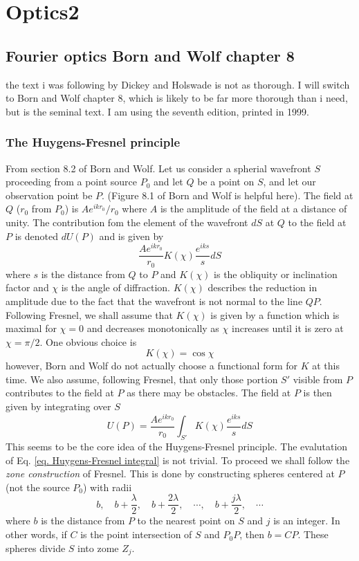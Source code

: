 \documentclass[../../main.tex]{subfiles} %
\begin{document}
\chapter{Optics2}
\section{Fourier optics Born and Wolf chapter 8 }
the text i was following by Dickey and Holswade is not as thorough. I will switch to Born and Wolf chapter 8, which is likely to be far more thorough than i need, but is the seminal text. I am using the seventh edition, printed in 1999.
\subsection{The Huygens-Fresnel principle}
From section 8.2 of Born and Wolf. Let us consider a spherial wavefront $S$ proceeding from a point source $P_0$ and let $Q$ be a point on $S$, and let our observation point be $P$. (Figure 8.1 of Born and Wolf is helpful here). The field at $Q$ ($r_0$ from $P_0$) is $A e^{ikr_0}/r_0$ where $A$ is the amplitude of the field at a distance of unity. The contribution fom the element of the wavefront $dS$ at $Q$ to the field at $P$ is denoted $dU(P)$ and is given by
\begin{equation}
    \frac{Ae^{ikr_0}}{r_0}K(\chi)\frac{e^{iks}}{s}dS
\end{equation}
where $s$ is the distance from $Q$ to $P$ and $K(\chi)$ is the obliquity or inclination factor and $\chi$ is the angle of diffraction. $K(\chi)$ describes the reduction in amplitude due to the fact that the wavefront is not normal to the line $QP$. Following Fresnel, we shall assume that $K(\chi)$ is given by a function which is maximal for $\chi=0$ and decreases monotonically as $\chi$ increases until it is zero at $\chi=\pi/2$. One obvious choice is 
\begin{equation}
    K(\chi)=\cos\chi
\end{equation}
however, Born and Wolf do not actually choose a functional form for $K$ at this time. We also assume, following Fresnel, that only those portion $S'$ visible from $P$ contributes to the field at $P$ as there may be obstacles. The field at $P$ is then given by integrating over $S$
\begin{equation}\label{eq. Huygens-Fresnel integral}
    U(P)=\frac{Ae^{ikr_0}}{r_0}\int_{S'}K(\chi)\frac{e^{iks}}{s}dS
\end{equation}
This seems to be the core idea of the Huygens-Fresnel principle. The evalutation of Eq. \ref{eq. Huygens-Fresnel integral} is not trivial. To proceed we shall follow the \textit{zone construction} of Fresnel. This is done by constructing spheres centered at $P$ (not the source $P_0$) with radii $$b,\quad b+\frac{\lambda}{2},\quad b+\frac{2\lambda}{2},\quad \cdots,\quad b+\frac{j\lambda}{2},\quad\cdots$$ where $b$ is the distance from $P$ to the nearest point on $S$ and $j$ is an integer. In other words, if $C$ is the point intersection of $S$ and $P_0P$, then $b=CP$. These spheres divide $S$ into zome $Z_j$.
\end{document}
